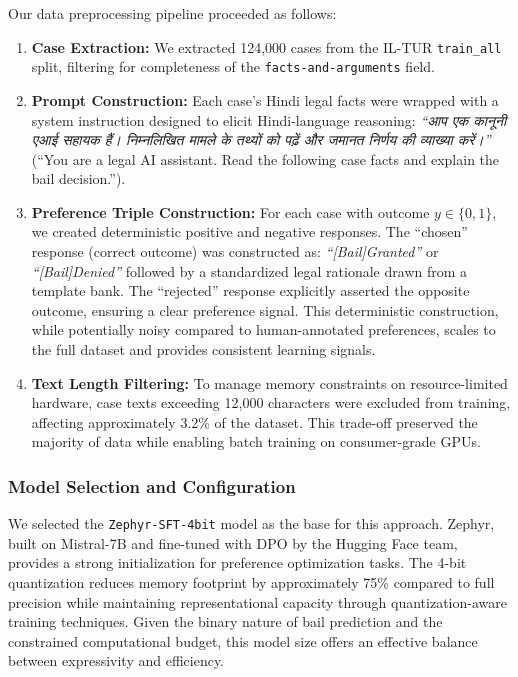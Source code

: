 \documentclass[conference]{IEEEtran}
\begin{document}
Our data preprocessing pipeline proceeded as follows:
\begin{enumerate}
    \item \textbf{Case Extraction:} We extracted 124,000 cases from the IL-TUR \texttt{train\_all} split, filtering for completeness of the \texttt{facts-and-arguments} field.
    \item \textbf{Prompt Construction:} Each case's Hindi legal facts were wrapped with a system instruction designed to elicit Hindi-language reasoning: \textit{``आप एक कानूनी एआई सहायक हैं। निम्नलिखित मामले के तथ्यों को पढ़ें और जमानत निर्णय की व्याख्या करें।''} (``You are a legal AI assistant. Read the following case facts and explain the bail decision.'').
    \item \textbf{Preference Triple Construction:} For each case with outcome $y \in \{0, 1\}$, we created deterministic positive and negative responses. The ``chosen'' response (correct outcome) was constructed as: \textit{``[Bail]Granted''} or \textit{``[Bail]Denied''} followed by a standardized legal rationale drawn from a template bank. The ``rejected'' response explicitly asserted the opposite outcome, ensuring a clear preference signal. This deterministic construction, while potentially noisy compared to human-annotated preferences, scales to the full dataset and provides consistent learning signals.
    \item \textbf{Text Length Filtering:} To manage memory constraints on resource-limited hardware, case texts exceeding 12,000 characters were excluded from training, affecting approximately 3.2\% of the dataset. This trade-off preserved the majority of data while enabling batch training on consumer-grade GPUs.
\end{enumerate}

\subsubsection{Model Selection and Configuration}
We selected the \texttt{Zephyr-SFT-4bit} model as the base for this approach. Zephyr, built on Mistral-7B and fine-tuned with DPO by the Hugging Face team, provides a strong initialization for preference optimization tasks. The 4-bit quantization reduces memory footprint by approximately 75\% compared to full precision while maintaining representational capacity through quantization-aware training techniques. Given the binary nature of bail prediction and the constrained computational budget, this model size offers an effective balance between expressivity and efficiency.
\end{document}
